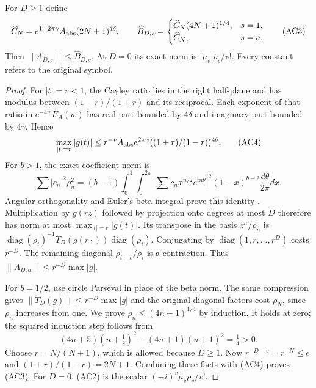 \begin{hzocproposition}
For $D\ge1$ define
\[
 \widehat C_N=e^{1+2\pi\gamma} A_{\rm abs}(2N+1)^{4\delta},\qquad
 \widehat B_{D,s}=
 \begin{cases}\widehat C_N(4N+1)^{1/4},&s=1,\\
 \widehat C_N,&s=a.
 \end{cases}\tag{AC3}
\]
Then $\|A_{D,s}\|\le\widehat B_{D,s}$. At $D=0$ its exact norm is
$|\mu_v|\rho_v/v!$. Every constant refers to the original symbol.
\end{hzocproposition}
\begin{proof}
For $|t|=r<1$, the Cayley ratio lies in the right half-plane and has
modulus between $(1-r)/(1+r)$ and its reciprocal. Each exponent of that
ratio in $e^{-4w}E_A(w)$ has real part bounded by $4\delta$ and
imaginary part bounded by $4\gamma$. Hence
\[
 \max_{|t|=r}|g(t)|\le
 r^{-v} A_{\rm abs}e^{2\pi\gamma}
 ((1+r)/(1-r))^{4\delta}.\tag{AC4}
\]
For $b>1$, the exact coefficient norm is
\[
 \sum|c_n|^2\rho_n^2=(b-1)\int_0^1\int_0^{2\pi}
 |\sum c_n x^{n/2}e^{in\theta}|^2(1-x)^{b-2}
 \frac{d\theta}{2\pi}dx.
\]
Angular orthogonality and Euler's beta integral prove this identity
\cite[5.12.1]{hzoc:DLMF5}. Multiplication by $g(rz)$ followed by projection
onto degrees at most $D$ therefore has norm at most $\max_{|t|=r}|g(t)|$.
Its transpose in the basis $z^n/\rho_n$ is
$\operatorname{diag}(\rho_i)^{-1}T_D(g(r\cdot))
\operatorname{diag}(\rho_i)$. Conjugating by
$\operatorname{diag}(1,r,\ldots,r^D)$ costs $r^{-D}$.
The remaining diagonal $\rho_{i+v}/\rho_i$ is a contraction. Thus
$\|A_{D,a}\|\le r^{-D}\max|g|$.

For $b=1/2$, use circle Parseval in place of the beta norm. The same
compression gives $\|T_D(g)\|\le r^{-D}\max|g|$ and the original
diagonal factors cost $\rho_N$, since $\rho_n$ increases from one.
We prove $\rho_n\le(4n+1)^{1/4}$ by induction. It holds at zero;
the squared induction step follows from
\[
 (4n+5)(n+\tfrac12)^2-(4n+1)(n+1)^2=\tfrac14>0.
\]
Choose $r=N/(N+1)$, which is allowed because $D\ge1$. Now
$r^{-D-v}=r^{-N}\le e$ and $(1+r)/(1-r)=2N+1$.
Combining these facts with (AC4) proves (AC3). For $D=0$, (AC2) is
the scalar $(-i)^v\mu_v\rho_v/v!$.
\end{proof}


